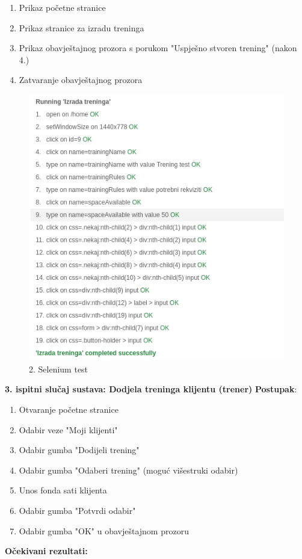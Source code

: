 		\begin{enumerate}
		    \item Prikaz početne stranice
                \item Prikaz stranice za izradu treninga
                \item Prikaz obavještajnog prozora s porukom "Uspješno stvoren trening" (nakon 4.)
                \item Zatvaranje obavještajnog prozora
		\end{enumerate}
            \begin{figure}[H]
		\includegraphics[scale=1]{./Slike/izrada_treninga.png}
		\centering
		\caption{2. Selenium test}
		\label{fig:promjene}
	    \end{figure}
     \noindent \textbf{3. ispitni slučaj sustava: Dodjela treninga klijentu (trener)}
            \newline \textbf{Postupak}:
            \begin{enumerate}
                
            \item Otvaranje početne stranice

            \item Odabir veze "Moji klijenti"

            \item Odabir gumba "Dodijeli trening"

            \item Odabir gumba "Odaberi trening" (moguć višestruki odabir)

            \item Unos fonda sati klijenta

            \item Odabir gumba "Potvrdi odabir"

            \item Odabir gumba "OK" u obavještajnom prozoru

            \end{enumerate}
            \textbf{Očekivani rezultati:}
            

